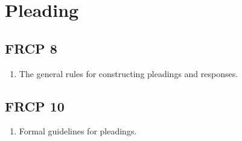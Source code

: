 \section{Pleading}

\subsection{FRCP 8}

\begin{enumerate}
    \item The general rules for constructing pleadings and responses.
\end{enumerate}

\subsection{FRCP 10}

\begin{enumerate}
    \item Formal guidelines for pleadings.
\end{enumerate}

% 
% 
% 
% 
% 
% 
% 

